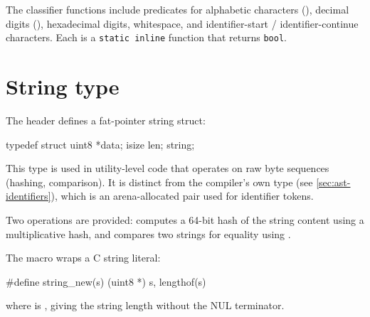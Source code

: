 \pnum
The classifier functions include predicates for alphabetic characters
(), decimal digits (),
hexadecimal digits, whitespace, and identifier-start / identifier-continue
characters.  Each is a \texttt{static inline} function that returns \texttt{bool}.

\section{String type}
\label{sec:infra-string}

\pnum
The header  defines a fat-pointer string struct:

\begin{ccode}
typedef struct {
    uint8 *data;
    isize  len;
} string;
\end{ccode}

\pnum
This type is used in utility-level code that operates on raw byte sequences
(hashing, comparison).  It is distinct from the compiler's own  type
(see \cref{sec:ast-identifiers}), which is an arena-allocated 
pair used for identifier tokens.

\pnum
Two operations are provided:  computes a 64-bit hash of
the string content using a multiplicative hash, and 
compares two strings for equality using .

\pnum
The  macro wraps a C string literal:

\begin{ccode}
#define string_new(s)  { (uint8 *) s, lengthof(s) }
\end{ccode}

where  is , giving the string length
without the NUL terminator.
